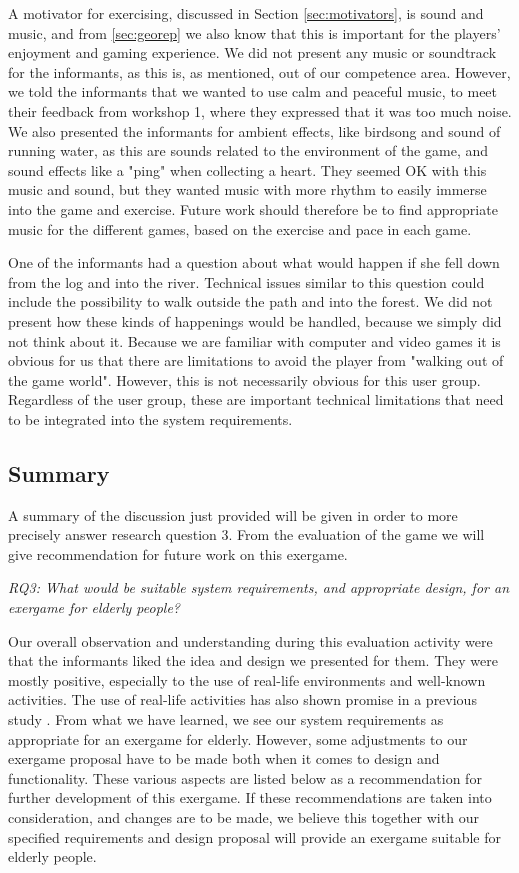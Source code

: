 A motivator for exercising, discussed in Section \ref{sec:motivators}, is sound and music, and from \ref{sec:georep} we also know that this is important for the players' enjoyment and gaming experience. We did not present any music or soundtrack for the informants, as this is, as mentioned, out of our competence area. However, we told the informants that we wanted to use calm and peaceful music, to meet their feedback from workshop 1, where they expressed that it was too much noise. We also presented the informants for ambient effects, like birdsong and sound of running water, as this are sounds related to the environment of the game, and sound effects like a "ping" when collecting a heart. They seemed OK with this music and sound, but they wanted music with more rhythm to easily immerse into the game and exercise. Future work should therefore be to find appropriate music for the different games, based on the exercise and pace in each game. 

One of the informants had a question about what would happen if she fell down from the log and into the river. Technical issues similar to this question could include the possibility to walk outside the path and into the forest. We did not present how these kinds of happenings would be handled, because we simply did not think about it. Because we are familiar with computer and video games it is obvious for us that there are limitations to avoid the player from "walking out of the game world". However, this is not necessarily obvious for this user group. Regardless of the user group, these are important technical limitations that need to be integrated into the system requirements. 

\subsection{Summary}
\label{sec:summarydiscW2}
A summary of the discussion just provided will be given in order to more precisely answer research question 3. From the evaluation of the game we will give recommendation for future work on this exergame. 

\emph{RQ3: What would be suitable system requirements, and appropriate design, for an exergame for elderly people?}

Our overall observation and understanding during this evaluation activity were that the informants liked the idea and design we presented for them. They were mostly positive, especially to the use of real-life environments and well-known activities. The use of real-life activities has also shown promise in a previous study \cite{gerling2}. From what we have learned, we see our system requirements as appropriate for an exergame for elderly. However, some adjustments to our exergame proposal have to be made both when it comes to design and functionality. These various aspects are listed below as a recommendation for further development of this exergame. If these recommendations are taken into consideration, and changes are to be made, we believe this together with our specified requirements and design proposal will provide an exergame suitable for elderly people.  

